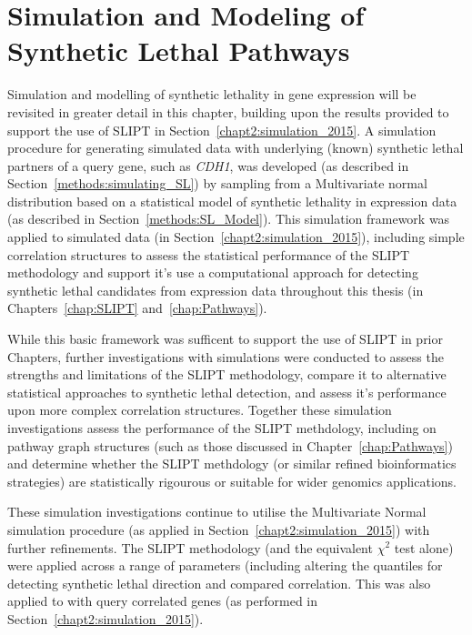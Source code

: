 \chapter{Simulation and Modeling of Synthetic Lethal Pathways}
\label{chap:simulation}

Simulation and modelling of synthetic lethality in gene expression will be revisited in greater detail in this chapter, building upon the results provided to support the use of \gls{SLIPT} in Section~\ref{chapt2:simulation_2015}. A simulation procedure for generating simulated data with underlying (known) synthetic lethal partners of a query gene, such as \textit{CDH1}, was developed (as described in Section~\ref{methods:simulating_SL}) by sampling from a Multivariate normal distribution based on a statistical model of synthetic lethality in expression data (as described in Section~\ref{methods:SL_Model}). This simulation framework was applied to simulated data (in Section~\ref{chapt2:simulation_2015}), including simple correlation structures to assess the statistical performance of the \gls{SLIPT} methodology and support it's use a computational approach for detecting synthetic lethal candidates from expression data throughout this thesis (in Chapters~\ref{chap:SLIPT} and~\ref{chap:Pathways}). 

While this basic framework was sufficent to support the use of \gls{SLIPT} in prior Chapters, further investigations with simulations were conducted to assess the strengths and limitations of the \gls{SLIPT} methodology, compare it to alternative statistical approaches to synthetic lethal detection, and assess it's performance upon more complex correlation structures. Together these simulation investigations assess the performance of the \gls{SLIPT} methdology, including on pathway graph structures (such as those discussed in Chapter~\ref{chap:Pathways}) and determine whether the \gls{SLIPT} methdology (or similar refined bioinformatics strategies) are statistically rigourous or suitable for wider genomics applications.

These simulation investigations continue to utilise the Multivariate Normal simulation procedure (as applied in Section~\ref{chapt2:simulation_2015}) with further refinements. The \gls{SLIPT} methodology (and the equivalent $\chi^2$ test alone) were applied across a range of parameters (including altering the quantiles for detecting synthetic lethal direction and compared correlation. This was also applied to with query correlated genes (as performed in Section~\ref{chapt2:simulation_2015}).

